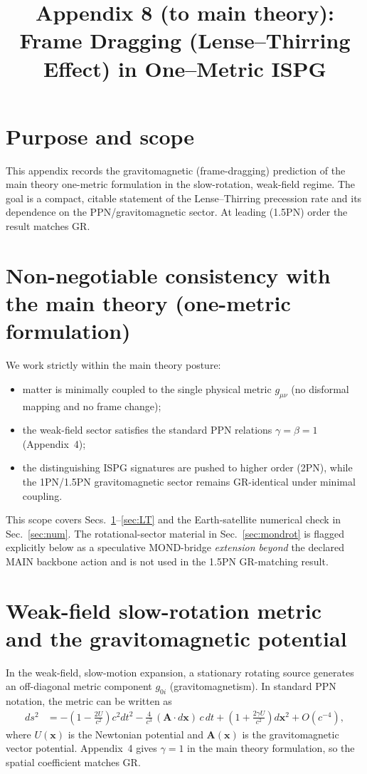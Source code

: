 \documentclass[11pt]{article}
\title{Appendix 8 (to main theory): Frame Dragging (Lense--Thirring Effect) in One--Metric ISPG}
\author{}
\date{}
\begin{document}
\let\phi\varphi
\maketitle

\section*{Purpose and scope}
This appendix records the gravitomagnetic (frame-dragging) prediction of the main theory one-metric formulation in the slow-rotation, weak-field regime. The goal is a compact, citable statement of the Lense--Thirring precession rate and its dependence on the PPN/gravitomagnetic sector. At leading (1.5PN) order the result matches GR.

\section*{Non-negotiable consistency with the main theory (one-metric formulation)}
We work strictly within the main theory posture:
\begin{itemize}
\item matter is minimally coupled to the single physical metric $g_{\mu\nu}$ (no disformal mapping and no frame change);
\item the weak-field sector satisfies the standard PPN relations $\gamma=\beta=1$ (Appendix~4);
\item the distinguishing ISPG signatures are pushed to higher order (2PN), while the 1PN/1.5PN gravitomagnetic sector remains GR-identical under minimal coupling.
\end{itemize}
This scope covers Secs.~\ref{sec:metric_app8}--\ref{sec:LT} and the Earth-satellite numerical check in Sec.~\ref{sec:num}. The rotational-sector material in Sec.~\ref{sec:mondrot} is flagged explicitly below as a speculative MOND-bridge \emph{extension beyond} the declared MAIN backbone action and is not used in the 1.5PN GR-matching result.

\section{Weak-field slow-rotation metric and the gravitomagnetic potential}\label{sec:metric_app8}
In the weak-field, slow-motion expansion, a stationary rotating source generates an off-diagonal metric component $g_{0i}$ (gravitomagnetism). In standard PPN notation, the metric can be written as
\begin{align}
ds^2 &= -\left(1-\frac{2U}{c^2}\right)c^2dt^2 - \frac{4}{c^3}\,(\bm{A}\cdot d\bm{x})\,c\,dt
+ \left(1+\frac{2\gamma U}{c^2}\right)d\bm{x}^2 + O(c^{-4}),
\label{eq:ppn_gm}
\end{align}
where $U(\bm{x})$ is the Newtonian potential and $\bm{A}(\bm{x})$ is the gravitomagnetic vector potential. Appendix~4 gives $\gamma=1$ in the main theory formulation, so the spatial coefficient matches GR.
\end{document}
